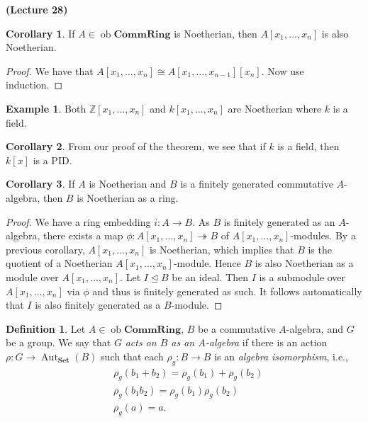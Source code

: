 \documentclass[10pt,letterpaper,cm]{nupset}
\theoremstyle{definition}
\newtheorem*{definition}{Definition}
\newtheorem{exmp}{Example}
\newtheorem{corollary}{Corollary}
\newcommand{\Z}{\mathbb Z}
\newcommand{\1}{\mathbf{1}}
\newcommand{\0}{\vec 0}
\DeclareMathOperator{\aut}{Aut}
\DeclareMathOperator{\ob}{ob}
\begin{document}
\begin{center}
{\textbf{(Lecture 28)}}
\end{center}

\begin{corollary}
If $A \in \ob \mathbf{CommRing}$ is Noetherian, then $A[x_1, \ldots, x_n]$ is also Noetherian.
\end{corollary}
\begin{proof}
We have that $A[x_1, \ldots, x_n] \cong A[x_1, \ldots, x_{n-1}][x_n]$. Now use induction.
\end{proof}

\begin{exmp}
Both $\Z[x_1, \ldots, x_n]$ and $k[x_1, \ldots, x_n]$ are Noetherian where $k$ is a field.
\end{exmp}

\begin{corollary}
From our proof of the theorem, we see that if $k$ is a field, then $k[x]$ is a PID.
\end{corollary}

\begin{corollary}
If $A$ is Noetherian and $B$ is a finitely generated commutative $A$-algebra, then $B$ is Noetherian as a ring.
\end{corollary}
\begin{proof}
We have a ring embedding $i: A \to B$. As $B$ is finitely generated as an $A$-algebra, there exists a map $\phi: A[x_1, \ldots, x_n] \twoheadrightarrow B$ of $A[x_1, \ldots, x_n]$-modules. By a previous corollary, $A[x_1, \ldots, x_n]$ is Noetherian, which implies that $B$ is the quotient of a Noetherian $A[x_1, \ldots, x_n]$-module. Hence $B$ is also Noetherian as a module over $A[x_1, \ldots, x_n]$. Let $I\unlhd B$ be an ideal. Then $I$ is a submodule over $A[x_1, \ldots, x_n]$ via $\phi$ and thus is finitely generated as such. It follows automatically that $I$ is also finitely generated as a $B$-module.
\end{proof}

\begin{definition}
Let $A \in \ob \mathbf{CommRing}$, $B$ be a commutative $A$-algebra, and $G$ be a group. We say that $G$ \textit{acts on $B$ as an $A$-algebra} if there is an action $\rho : G \to \aut_{\mathbf{Set}}(B)$ such that each  $\rho_g  : B \to B$ is an \textit{algebra isomorphism}, i.e., 
\begin{align*}
&  \rho_g(b_1 +b_2) = \rho_g(b_1) + \rho_g(b_2)
\\ & \rho_g(b_1b_2) = \rho_g(b_1)\rho_g(b_2)
\\ & \rho_g(a) = a
.\end{align*}
\end{definition}
\end{document}
